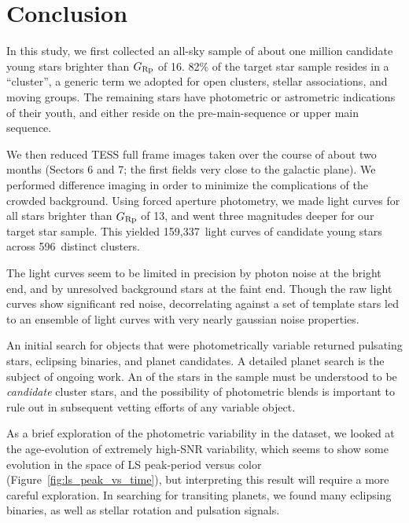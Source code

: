 \documentclass[12pt,twocolumn,tighten]{aastex62}
\newcommand{\numberlcs}{159{,}337\ } %
\newcommand{\numberclusters}{596\ } %
\begin{document}


\section{Conclusion}
\label{sec:conclusion}

In this study, we first collected an all-sky sample of about one million
candidate young stars brighter than $G_{\rm Rp}$ of 16.
82\% of the target star sample resides in a ``cluster'', a generic
term we adopted for open clusters, stellar associations, and moving
groups.
The remaining stars have photometric or astrometric indications of
their youth, and either reside on the pre-main-sequence or upper
main sequence.

We then reduced TESS full frame images taken over the course of about
two months (Sectors 6 and 7; the first fields very close to the galactic
plane).
We performed difference imaging in order to minimize the complications
of the crowded background.
Using forced aperture photometry, we made light curves for all stars
brighter than $G_{\rm Rp}$ of 13, and went three magnitudes deeper for
our target star sample.
This yielded \numberlcs light curves of candidate young stars across
\numberclusters distinct clusters.

The light curves seem to be limited in precision by photon noise at
the bright end, and by unresolved background stars at the faint end.
Though the raw light curves show significant red noise, decorrelating
against a set of template stars led to an ensemble of light curves
with very nearly gaussian noise properties.

An initial search for objects that were photometrically variable
returned pulsating stars, eclipsing binaries, and planet candidates.
A detailed planet search is the subject of ongoing work.
An of the stars in the sample must be understood to be {\it candidate}
cluster stars, and the possibility of photometric blends 
is important to rule out in subsequent vetting efforts of any variable
object.

As a brief exploration of the photometric variability in the dataset,
we looked at the age-evolution of extremely high-SNR variability,
which seems to show some evolution in the space of LS peak-period
versus color (Figure~\ref{fig:ls_peak_vs_time}), but interpreting this
result will require a more careful exploration.  In searching for
transiting planets, we found many eclipsing binaries, as well as
stellar rotation and pulsation signals.
\end{document}
